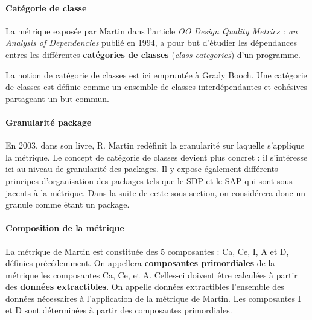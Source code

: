 \documentclass{scrartcl}
\begin{document}
    \paragraph{Catégorie de classe}La métrique exposée par Martin dans l'article \textit{OO Design Quality Metrics : an Analysis of Dependencies}\cite{Martin:1994} publié en 1994, a pour but d'étudier les dépendances entres les différentes \textbf{catégories de classes} (\emph{class categories}) d'un programme. 
    
    La notion de catégorie de classes est ici empruntée à Grady Booch\cite{Booch:1991}. Une catégorie de classes est définie comme un ensemble de classes interdépendantes et cohésives partageant un but commun.
    
    \paragraph{Granularité package}En 2003, dans son livre\cite{Martin:2003}, R. Martin redéfinit la granularité sur laquelle s'applique la métrique. Le concept de catégorie de classes devient plus concret : il s'intéresse ici au niveau de granularité des packages. Il y expose également différents principes d'organisation des packages tels que le SDP et le SAP qui sont sous-jacents à la métrique. Dans la suite de cette sous-section, on considérera donc un granule comme étant un package.



    \paragraph{Composition de la métrique}La métrique de Martin est constituée des 5 composantes : Ca, Ce, I, A et D, définies précédemment. On appellera \textbf{composantes primordiales} de la métrique les composantes Ca, Ce, et A. Celles-ci doivent être calculées à partir des \textbf{données extractibles}. On appelle données extractibles l'ensemble des données nécessaires à l'application de la métrique de Martin. Les composantes I et D sont déterminées à partir des composantes primordiales.
    
\end{document}
